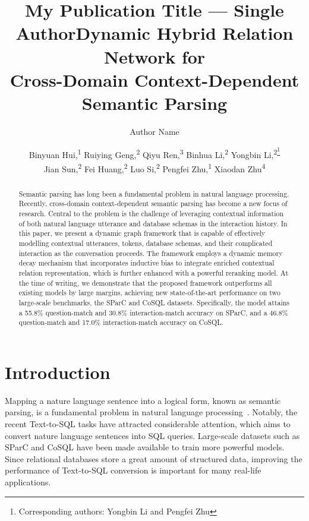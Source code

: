 \documentclass[letterpaper]{article} \usepackage{aaai21}  \usepackage{times}  \usepackage{helvet} \usepackage{courier}  \usepackage[hyphens]{url}  \usepackage{graphicx} \urlstyle{rm} \def\UrlFont{\rm}  \usepackage{natbib}  \usepackage{caption} \frenchspacing  \setlength{\pdfpagewidth}{8.5in}  \setlength{\pdfpageheight}{11in}
\title{My Publication Title --- Single Author}
\author {
Author Name \\
}
\title{Dynamic Hybrid Relation Network for \\
 Cross-Domain Context-Dependent Semantic Parsing}
\author {


        Binyuan Hui,\textsuperscript{\rm 1}
        Ruiying Geng,\textsuperscript{\rm 2}
        Qiyu Ren,\textsuperscript{\rm 3}
        Binhua Li,\textsuperscript{\rm 2}
        Yongbin Li,\textsuperscript{\rm 2\footnote{Corresponding authors: Yongbin Li and Pengfei Zhu}}  \\
        Jian Sun,\textsuperscript{\rm 2}
        Fei Huang,\textsuperscript{\rm 2}
        Luo Si,\textsuperscript{\rm 2}
        Pengfei Zhu,\textsuperscript{\rm 1\footnotemark[1]} 
        Xiaodan Zhu\textsuperscript{\rm 4}
        
}
\begin{document}
\maketitle

\begin{abstract}
Semantic parsing has long been a fundamental problem in natural language processing.
Recently, cross-domain context-dependent semantic parsing has become a new focus of research. Central to the problem is the challenge of leveraging contextual information of both natural language utterance and database schemas in the interaction history. 
In this paper, we present a dynamic graph framework that is capable of effectively modelling contextual utterances, tokens, database schemas, and their complicated interaction as the conversation proceeds.
The framework employs a dynamic memory decay mechanism that incorporates inductive bias to integrate enriched contextual relation representation, which is further enhanced with a powerful reranking model.  
At the time of writing, we demonstrate that the proposed framework outperforms all existing models by large margins, achieving new state-of-the-art performance on two large-scale benchmarks, the SParC and CoSQL datasets. Specifically, the model attains a 55.8\% question-match and 30.8\% interaction-match accuracy on SParC, and a 46.8\% question-match and 17.0\% interaction-match accuracy on CoSQL. 
\end{abstract}

\section{Introduction}



Mapping a nature language sentence into a logical form, known as semantic parsing, is a fundamental problem in natural language processing~\cite{DBLP:conf/aaai/ZelleM96,DBLP:conf/uai/ZettlemoyerC05,DBLP:conf/acl/WongM07,DBLP:conf/emnlp/ZettlemoyerC07,Li2014ConstructingAI,Yaghmazadeh2017SQLizerQS,DBLP:conf/acl/IyerKCKZ17}.
Notably, the recent Text-to-SQL tasks have attracted considerable attention, which aims to convert nature language sentences into SQL queries. Large-scale datasets such as SParC \cite{DBLP:conf/acl/YuZYTLLELPCJDPS19} and CoSQL \cite{DBLP:conf/emnlp/YuZELXPLTSLJYSC19} have been made available to train more powerful models. Since relational databases store a great amount of structured data, improving the performance of Text-to-SQL conversion is important for many real-life applications.
\end{document}
